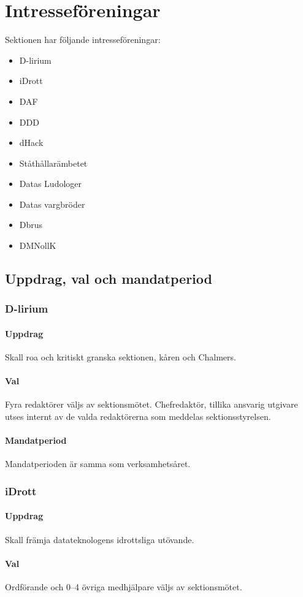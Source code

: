 \section{Intresseföreningar}
Sektionen har följande intresseföreningar:
\begin{itemize}
  \item D-lirium 
  \item iDrott 
  \item DAF 
  \item DDD
  \item dHack
  \item Ståthållarämbetet
  \item Datas Ludologer 
  \item Datas vargbröder
  \item Dbrus
  \item DMNollK
\end{itemize}
\subsection{Uppdrag, val och mandatperiod}
\subsubsection{D-lirium}
\paragraph{Uppdrag}
Skall roa och kritiskt granska sektionen, kåren och Chalmers. 
\paragraph{Val}
Fyra redaktörer väljs av sektionsmötet. Chefredaktör, tillika ansvarig utgivare utses internt av de valda redaktörerna som meddelas sektionsstyrelsen. 
\paragraph{Mandatperiod}
Mandatperioden är samma som verksamhetsåret. 
\subsubsection{iDrott}
\paragraph{Uppdrag}
Skall främja datateknologens idrottsliga utövande. 
\paragraph{Val}
Ordförande och 0--4 övriga medhjälpare väljs av sektionsmötet. 
